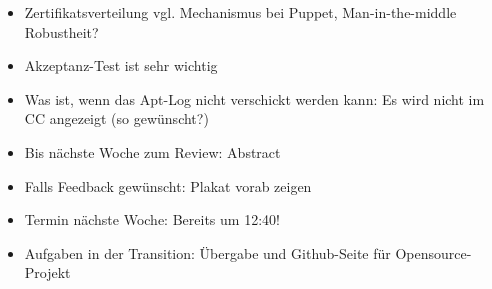 \documentclass[class=scrbook,crop=false]{standalone}
\begin{document}
	\begin{itemize}
        \item Zertifikatsverteilung vgl. Mechanismus bei Puppet, Man-in-the-middle Robustheit?
        \item Akzeptanz-Test ist sehr wichtig
        \item Was ist, wenn das Apt-Log nicht verschickt werden kann: Es wird nicht im CC angezeigt (so gewünscht?)
        \item Bis nächste Woche zum Review: Abstract
        \item Falls Feedback gewünscht: Plakat vorab zeigen
        \item Termin nächste Woche: Bereits um 12:40!
        \item Aufgaben in der Transition: Übergabe und Github-Seite für Opensource-Projekt
    \end{itemize}
    
\end{document}
